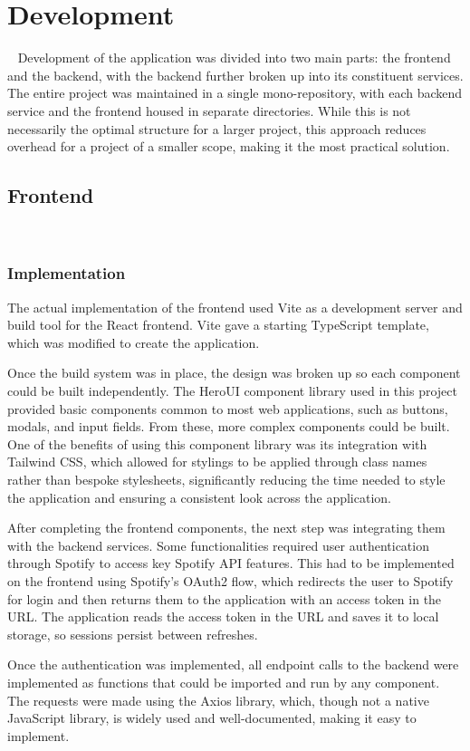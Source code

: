 \chapter{Development}~\label{cha:development}
Development of the application was divided into two main parts: the frontend and the backend, with the backend further broken up into its constituent services. The entire project was maintained in a single mono-repository, with each backend service and the frontend housed in separate directories. While this is not necessarily the optimal structure for a larger project, this approach reduces overhead for a project of a smaller scope, making it the most practical solution.

\section{Frontend}~\label{sec:frontend-development}
\subsection{Implementation}
The actual implementation of the frontend used Vite as a development server and build tool for the React frontend. Vite gave a starting TypeScript template, which was modified to create the application.

Once the build system was in place, the design was broken up so each component could be built independently. The HeroUI component library used in this project provided basic components common to most web applications, such as buttons, modals, and input fields. From these, more complex components could be built. One of the benefits of using this component library was its integration with Tailwind CSS, which allowed for stylings to be applied through class names rather than bespoke stylesheets, significantly reducing the time needed to style the application and ensuring a consistent look across the application.

After completing the frontend components, the next step was integrating them with the backend services. Some functionalities required user authentication through Spotify to access key Spotify API features. This had to be implemented on the frontend using Spotify’s OAuth2 flow, which redirects the user to Spotify for login and then returns them to the application with an access token in the URL. The application reads the access token in the URL and saves it to local storage, so sessions persist between refreshes.

Once the authentication was implemented, all endpoint calls to the backend were implemented as functions that could be imported and run by any component. The requests were made using the Axios library, which, though not a native JavaScript library, is widely used and well-documented, making it easy to implement.

